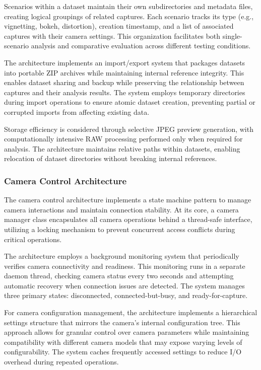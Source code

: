 Scenarios within a dataset maintain their own subdirectories and metadata files, creating logical groupings of related captures. Each scenario tracks its type (e.g., vignetting, bokeh, distortion), creation timestamp, and a list of associated captures with their camera settings. This organization facilitates both single-scenario analysis and comparative evaluation across different testing conditions.

The architecture implements an import/export system that packages datasets into portable ZIP archives while maintaining internal reference integrity. This enables dataset sharing and backup while preserving the relationship between captures and their analysis results. The system employs temporary directories during import operations to ensure atomic dataset creation, preventing partial or corrupted imports from affecting existing data.

Storage efficiency is considered through selective JPEG preview generation, with computationally intensive RAW processing performed only when required for analysis. The architecture maintains relative paths within datasets, enabling relocation of dataset directories without breaking internal references.

\subsubsection{Camera Control Architecture}
The camera control architecture implements a state machine pattern to manage camera interactions and maintain connection stability. At its core, a camera manager class encapsulates all camera operations behind a thread-safe interface, utilizing a locking mechanism to prevent concurrent access conflicts during critical operations.

The architecture employs a background monitoring system that periodically verifies camera connectivity and readiness. This monitoring runs in a separate daemon thread, checking camera status every two seconds and attempting automatic recovery when connection issues are detected. The system manages three primary states: disconnected, connected-but-busy, and ready-for-capture.

For camera configuration management, the architecture implements a hierarchical settings structure that mirrors the camera's internal configuration tree. This approach allows for granular control over camera parameters while maintaining compatibility with different camera models that may expose varying levels of configurability. The system caches frequently accessed settings to reduce I/O overhead during repeated operations.

